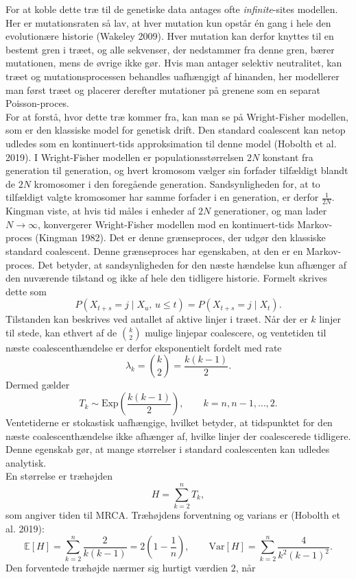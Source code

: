 \documentclass[
  10pt,
  a4paper,
]{scrbook}
\let\oldemph\emph
\renewcommand\emph[1]{\oldemph{\color{gray}#1}}
\begin{document}
For at koble dette træ til de genetiske data antages ofte
\emph{infinite}-sites modellen. Her er mutationsraten så lav, at hver
mutation kun opstår én gang i hele den evolutionære historie (Wakeley
2009). Hver mutation kan derfor knyttes til en bestemt gren i træet, og
alle sekvenser, der nedstammer fra denne gren, bærer mutationen, mens de
øvrige ikke gør. Hvis man antager selektiv neutralitet, kan træet og
mutationsprocessen behandles uafhængigt af hinanden, her modellerer man
først træet og placerer derefter mutationer på grenene som en separat
Poisson-proces.\\
For at forstå, hvor dette træ kommer fra, kan man se på Wright-Fisher
modellen, som er den klassiske model for genetisk drift. Den standard
coalescent kan netop udledes som en kontinuert-tids approksimation til
denne model (Hobolth et al. 2019). I Wright-Fisher modellen er
populationsstørrelsen \(2N\) konstant fra generation til generation, og
hvert kromosom vælger sin forfader tilfældigt blandt de \(2N\)
kromosomer i den foregående generation. Sandsynligheden for, at to
tilfældigt valgte kromosomer har samme forfader i en generation, er
derfor \(\frac{1}{2N}\). Kingman viste, at hvis tid måles i enheder af
\(2N\) generationer, og man lader \(N \to \infty\), konvergerer
Wright-Fisher modellen mod en kontinuert-tids Markov-proces (Kingman
1982). Det er denne grænseproces, der udgør den klassiske standard
coalescent. Denne grænseproces har egenskaben, at den er en
Markov-proces. Det betyder, at sandsynligheden for den næste hændelse
kun afhænger af den nuværende tilstand og ikke af hele den tidligere
historie. Formelt skrives dette som \[
P(X_{t+s} = j \mid X_u, \, u \leq t) = P(X_{t+s} = j \mid X_t).
\] Tilstanden kan beskrives ved antallet af aktive linjer i træet. Når
der er \(k\) linjer til stede, kan ethvert af de \(\binom{k}{2}\) mulige
linjepar coalescere, og ventetiden til næste coalescenthændelse er
derfor eksponentielt fordelt med rate \[
\lambda_k = \binom{k}{2}= \frac{k(k-1)}{2}.
\] Dermed gælder \[
T_k \sim \mathrm{Exp}\!\left(\frac{k(k-1)}{2}\right), \qquad k = n, n-1, \ldots, 2.
\] Ventetiderne er stokastisk uafhængige, hvilket betyder, at
tidspunktet for den næste coalescenthændelse ikke afhænger af, hvilke
linjer der coalescerede tidligere. Denne egenskab gør, at mange
størrelser i standard coalescenten kan udledes analytisk.\\
En størrelse er træhøjden \[
H = \sum_{k=2}^{n} T_k,
\] som angiver tiden til MRCA. Træhøjdens forventning og varians er
(Hobolth et al. 2019): \[
\mathbb{E}[H] = \sum_{k=2}^{n} \frac{2}{k(k-1)} = 2\!\left(1 - \frac{1}{n}\right), \qquad
\mathrm{Var}[H] = \sum_{k=2}^{n} \frac{4}{k^2(k-1)^2}.
\] Den forventede træhøjde nærmer sig hurtigt værdien \(2\), når
\end{document}
